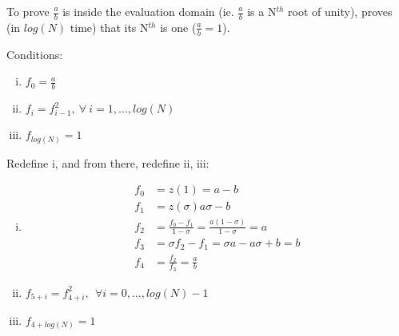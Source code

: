 \documentclass{article}
\theoremstyle{definition}
\begin{document}
To prove $\frac{a}{b}$ is inside the evaluation domain (ie. $\frac{a}{b}$ is a N$^{th}$ root of unity), proves (in $log(N)$ time) that its N$^{th}$ is one ($\frac{a}{b} = 1$).

Conditions:
\begin{enumerate}[i.]
	\item $f_0=\frac{a}{b}$
	\item $f_i = f_{i-1}^2,~\forall~i=1, \ldots, log(N)$
	\item $f_{log(N)} = 1$
\end{enumerate}


Redefine i, and from there, redefine ii, iii:

\begin{enumerate}[i.]
	\item \begin{align*}
		f_0 &= z(1) = a - b\\
		f_1 &= z(\sigma) a \sigma -b\\
		f_2 &= \frac{f_0 - f_1}{1 - \sigma} = \frac{a(1-\sigma)}{1-\sigma} = a\\
		f_3 &= \sigma f_2 - f_1 = \sigma a - a \sigma + b = b\\
		f_4 &= \frac{f_2}{f_3} = \frac{a}{b}
	\end{align*}
	\item $f_{5+i} = f_{4+i}^2,~~\forall i=0, \ldots, log(N)-1$
	\item $f_{4+log(N)} = 1$
\end{enumerate}
\end{document}
